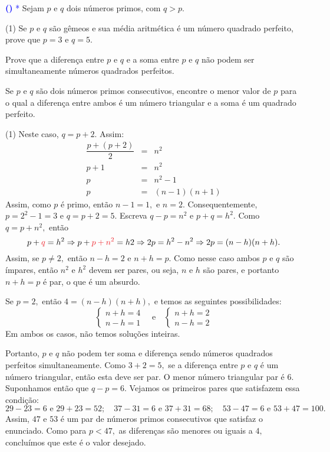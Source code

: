\documentclass[12pt, a4paper]{article}
\newcommand{\negrito}[1]{\mbox{\boldmath{$#1$}}}
\newcounter{exercicio}[section]
\newenvironment{exercicio}[1][]{\refstepcounter{exercicio}\par\medskip
 \textcolor{blue}{\bf(\theexercicio)} \rmfamily}{\medskip }
\newcommand{\itens}[1]{\begin{tasks}[label={(tsk[a])},label-width=3.6ex, label-format = {\bfseries}, column-sep = {0pt}](1) #1\end{tasks}}
\newcommand{\alt}[1]{\textcolor{Floresta}{$\negrito{(#1)} $}}
\begin{document}
\begin{exercicio}\textcolor{Blue}{*}
Sejam $p$ e $q$ dois números primos, com $q > p.$ 
\itens{
\task[\alt{a}] Se $p$ e $q$ são gêmeos e sua média aritmética é um número quadrado perfeito, prove que $p = 3$ e $q = 5.$

\task[\alt{b}] Prove que a diferença entre $p$ e $q$ e a soma entre $p$ e $q$ não podem ser simultaneamente números quadrados perfeitos.

\task[\alt{c}] Se $p$ e $q$ são dois números primos consecutivos, encontre o menor valor de $p$ para o qual a diferença entre ambos é um número triangular e a soma é um quadrado perfeito.
 
 }
\end{exercicio}
\begin{solution}
\itens{
\task[\alt{a}] Neste caso, $q = p + 2.$ Assim:
\[\begin{array}{rcl}
    \dfrac{p+(p+2)}{2} &=& n^2 \\
    p+1 &=&n^2 \\
    p &=& n^2 - 1 \\
    p &=& (n-1)(n+1)
\end{array}\]
Assim, como $p$ é primo, então $n - 1 = 1,$ e $n = 2.$ Consequentemente, $p = 2^2 - 1 = 3$ e $q = p + 2 = 5.$
\task[\alt{b}] 
Escreva $q - p = n^2$ e $p + q = h^2$. Como $q = p + n^2,$ então $$p+\textcolor{Red}{q} = h^2 \Rightarrow p+\textcolor{Red}{p+n^2} = h 2 \Rightarrow 2 p= h^2 - n^2 \Rightarrow 2p = (n-h)(n+h).$$
Assim, se $p \neq 2,$ então $n - h = 2$ e $n+h = p.$ Como nesse caso ambos $p$ e $q$ são ímpares, então $n^2$ e $h^2$ devem ser pares, ou seja, $n$ e $h$ são pares, e portanto $n+h = p$ é par, o que é um absurdo.

Se $p = 2,$ então $4 = (n-h)(n+h),$ e temos as seguintes possibilidades:
\[
\begin{cases}
n+h = 4 \\ n - h = 1
\end{cases} \quad \mbox{e} \quad \begin{cases}
n+h = 2 \\ n - h = 2
\end{cases}
\]
Em ambos os casos, não temos soluções inteiras.

Portanto, $p$ e $q$ não podem ter soma e diferença sendo números quadrados perfeitos simultaneamente.
\task[\alt{c}] Como $3+2 = 5,$ se a diferença entre $p$ e $q$ é um número triangular, então esta deve ser par. O menor número triangular par é $6.$ Suponhamos então que $q - p = 6.$ Vejamos os primeiros pares que satisfazem essa condição:
\[
29 - 23 = 6 \mbox{ e } 29 + 23 = 52; \quad 37 - 31 = 6 \mbox{ e } 37 + 31 = 68; \quad 53 - 47 = 6 \mbox{ e } 53 + 47 = 100.
\]
Assim, $47$ e $53$ é um par de números primos consecutivos que satisfaz o enunciado. Como para $p < 47,$ as diferenças são menores ou iguais a $4,$ concluímos que este é o valor desejado.
}

\end{solution}
\end{document}
